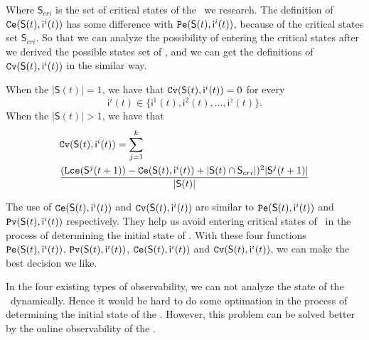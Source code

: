 Where $\mathsf{S}_{cri}$ is the set of critical states of the \BCN\ we research. The definition of ${\tt Ce}(\mathsf{S}(t), \mathsf{ i}^{i}(t))$ has some difference with ${\tt Pe}(\mathsf{S}(t), \mathsf{ i}^{i}(t))$, because of the critical states set $\mathsf{S}_{cri}$. So that we can analyze the possibility of entering the critical states after we derived the possible states set of \BCNs, and we can get the definitions of ${\tt Cv}(\mathsf{S}(t), \mathsf{ i}^{i}(t))$ in the similar way. %

\begin{definition} 
When the $|\mathsf{S}(t)|=1$, we have that
${\tt Cv}(\mathsf{S}(t), \mathsf{ i}^{i}(t))=0$ for every  \[\mathsf{ i}^{i}(t) \in \{\mathsf{ i}^{1}(t),\mathsf{ i}^{2}(t),\ldots, \mathsf{ i}^{z}(t)\}.\]   When the $|\mathsf{S}(t)|>1$, 
we have that  \\
\begin{equation}
\begin{split}
&{\tt Cv}(\mathsf{S}(t), \mathsf{ i}^{i}(t))=\sum_{j=1}^k\\
&\frac{ ({\tt Lce}(\mathsf{S}^{j}(t+1))-{\tt Ce}(\mathsf{S}(t), \mathsf{ i}^{i}(t))+|\mathsf{S}(t) \cap \mathsf{S}_{cri}|)^2 |\mathsf{S}^{j}(t+1)|}{ |\mathsf{S}(t)|}
\end{split}
\end{equation}
\end{definition}

The use of ${\tt Ce}(\mathsf{S}(t), \mathsf{ i}^{i}(t))$ and ${\tt Cv}(\mathsf{S}(t), \mathsf{ i}^{i}(t))$ are similar to ${\tt Pe}(\mathsf{S}(t), \mathsf{ i}^{i}(t))$ and ${\tt Pv}(\mathsf{S}(t), \mathsf{ i}^{i}(t))$ respectively. They help us avoid entering critical states of \BCNs\ in the process of determining the initial state of \BCNs. With these four functions ${\tt Pe}(\mathsf{S}(t), \mathsf{ i}^{i}(t))$, ${\tt Pv}(\mathsf{S}(t), \mathsf{ i}^{i}(t))$, ${\tt Ce}(\mathsf{S}(t), \mathsf{ i}^{i}(t))$ and ${\tt Cv}(\mathsf{S}(t), \mathsf{ i}^{i}(t))$, we can make the best decision we like. 

In the four existing types of observability, we can not analyze the state of the \BCNs\ dynamically. Hence it would be hard to do some optimation in the process of determining the initial state of the \BCNs. However, this problem can be solved better by the online observability of the \BCNs.